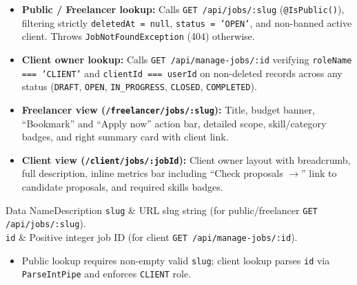 \begin{itemize}[leftmargin=1.6em,topsep=3pt,itemsep=2pt,parsep=0pt,label=$\bullet$]
    \item \textbf{Public / Freelancer lookup:} Calls \texttt{GET /api/jobs/:slug} (\texttt{@IsPublic()}), filtering strictly \texttt{deletedAt = null}, \texttt{status = 'OPEN'}, and non-banned active client. Throws \texttt{JobNotFoundException} (404) otherwise.
    \item \textbf{Client owner lookup:} Calls \texttt{GET /api/manage-jobs/:id} verifying \texttt{roleName === 'CLIENT'} and \texttt{clientId === userId} on non-deleted records across any status (\texttt{DRAFT}, \texttt{OPEN}, \texttt{IN\_PROGRESS}, \texttt{CLOSED}, \texttt{COMPLETED}).
\end{itemize}

\begin{itemize}[leftmargin=1.6em,topsep=3pt,itemsep=2pt,parsep=0pt,label=$\bullet$]
    \item \textbf{Freelancer view (\texttt{/freelancer/jobs/:slug}):} Title, budget banner, ``Bookmark'' and ``Apply now'' action bar, detailed scope, skill/category badges, and right summary card with client link.
    \item \textbf{Client view (\texttt{/client/jobs/:jobId}):} Client owner layout with breadcrumb, full description, inline metrics bar including ``Check proposals $\rightarrow$'' link to candidate proposals, and required skills badges.
\end{itemize}


\begin{specdatatable}{Data Name}{Description}
\texttt{slug} & URL slug string (for public/freelancer \texttt{GET /api/jobs/:slug}).\\ \hline
\texttt{id} & Positive integer job ID (for client \texttt{GET /api/manage-jobs/:id}).\\ \hline
\end{specdatatable}

\begin{itemize}[leftmargin=1.6em,topsep=3pt,itemsep=2pt,parsep=0pt,label=$\bullet$]
    \item Public lookup requires non-empty valid \texttt{slug}; client lookup parses \texttt{id} via \texttt{ParseIntPipe} and enforces \texttt{CLIENT} role.
\end{itemize}

